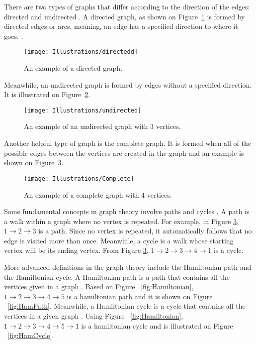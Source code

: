 There are two types of graphs that differ according to the direction of the edges: directed and undirected \cite{graphtheory}. A directed graph, as shown on Figure~\ref{fig:directedGraph}  is formed by directed edges or arcs, meaning, an edge has a specified direction to where it goes. \cite{ruohonen2013graph}.

\begin{figure}[H]
	\caption{An example of a directed graph.}
	\texttt{[image: Illustrations/directedd]}
	\centering
	\label{fig:directedGraph}
\end{figure}

Meanwhile, an undirected graph is formed by edges without a specified direction. It is illustrated on Figure~\ref{fig:undirectedGraph}.

\begin{figure}[H]
	\caption{An example of an undirected graph with 3 vertices.}
	\texttt{[image: Illustrations/undirected]}
	\centering
	\label{fig:undirectedGraph}
\end{figure}

Another helpful type of graph is the complete graph. It is formed when all of the possible edges between the vertices are created in the graph \cite{ruohonen2013graph} and an example is shown on Figure~\ref{fig:completeGraph}.

\begin{figure}[H]
	\caption{An example of a complete graph with 4 vertices.}
	\texttt{[image: Illustrations/Complete]}
	\centering
	\label{fig:completeGraph}
\end{figure}

Some fundamental concepts in graph theory involve paths and cycles \cite{brucato2013traveling}. A path is a walk within a graph where no vertex is repeated. For example, in Figure \ref{fig:completeGraph}, $ 1 \rightarrow 2 \rightarrow 3 $ is a path. Since no vertex is repeated, it automatically follows that no edge is visited more than once. Meanwhile, a cycle is a walk whose starting vertex will be its ending vertex. From Figure \ref{fig:completeGraph}, $ 1 \rightarrow 2 \rightarrow 3 \rightarrow 4 \rightarrow 1 $ is a cycle. \hfill \par 

More advanced definitions in the graph theory include the Hamiltonian path and the Hamiltonian cycle. A Hamiltonian path is a path that contains all the vertices given in a graph \cite{brucato2013traveling}. Based on Figure ~\ref{fig:Hamiltonian}, $ 1 \rightarrow 2 \rightarrow 3 \rightarrow 4 \rightarrow 5 $ is a hamiltonian path and it is shown on Figure ~\ref{fig:HamPath}. Meanwhile, a Hamiltonian cycle is a cycle that contains all the vertices in a given graph \cite{brucato2013traveling}. Using Figure ~\ref{fig:Hamiltonian}, $ 1 \rightarrow 2 \rightarrow 3 \rightarrow 4 \rightarrow 5 \rightarrow 1$ is a hamiltonian cycle and is illustrated on Figure ~\ref{fig:HamCycle}. 

